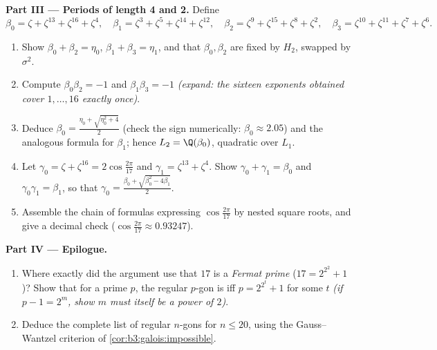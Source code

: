 \begin{problem}
\medskip
\noindent\textbf{Part III --- Periods of length 4 and 2.}
Define
\[
\beta_0 = \zeta + \zeta^{13} + \zeta^{16} + \zeta^{4},\quad
\beta_1 = \zeta^3 + \zeta^5 + \zeta^{14} + \zeta^{12},\quad
\beta_2 = \zeta^9 + \zeta^{15} + \zeta^{8} + \zeta^{2},\quad
\beta_3 = \zeta^{10} + \zeta^{11} + \zeta^{7} + \zeta^{6}.
\]
\begin{enumerate}[resume]
  \item Show $\beta_0 + \beta_2 = \eta_0$, $\beta_1 + \beta_3 =
        \eta_1$, and that $\beta_0, \beta_2$ are fixed by $H_2$,
        swapped by $\sigma^2$.
  \item Compute $\beta_0\beta_2 = -1$ and $\beta_1\beta_3 = -1$
        \emph{(expand: the sixteen exponents obtained cover
        $1, \dots, 16$ exactly once)}.
  \item Deduce $\beta_0 = \frac{\eta_0 + \sqrt{\eta_0^2 + 4}}2$
        (check the sign numerically: $\beta_0 \approx 2.05$) and
        the analogous formula for $\beta_1$; hence $L_2 =
        \Q(\beta_0)$, quadratic over $L_1$.
  \item Let $\gamma_0 = \zeta + \zeta^{16} =
        2\cos\frac{2\pi}{17}$ and $\gamma_1 = \zeta^{13} +
        \zeta^4$. Show $\gamma_0 + \gamma_1 = \beta_0$ and
        $\gamma_0\gamma_1 = \beta_1$, so that $\gamma_0 =
        \frac{\beta_0 + \sqrt{\beta_0^2 - 4\beta_1}}2$.
  \item Assemble the chain of formulas expressing
        $\cos\frac{2\pi}{17}$ by nested square roots, and give a
        decimal check ($\cos\frac{2\pi}{17} \approx 0.93247$).
\end{enumerate}

\medskip
\noindent\textbf{Part IV --- Epilogue.}
\begin{enumerate}[resume]
  \item Where exactly did the argument use that $17$ is a
        \emph{Fermat prime} ($17 = 2^{2^2} + 1$)? Show that for
        a prime $p$, the regular $p$-gon is  iff $p
        = 2^{2^t} + 1$ for some $t$ \emph{(if $p - 1 = 2^m$,
        show $m$ must itself be a power of $2$)}.
  \item Deduce the complete list of  regular
        $n$-gons for $n \leq 20$, using the Gauss--Wantzel
        criterion of \cref{cor:b3:galois:impossible}.
\end{enumerate}


\end{problem}
